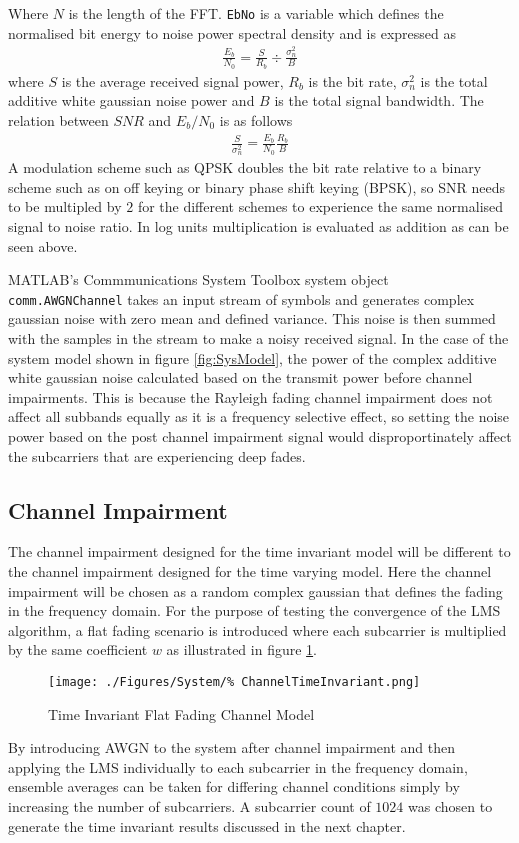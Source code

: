 Where $N$ is the length of the FFT. \texttt{EbNo} is a %
variable which defines the normalised bit energy %
to noise power spectral density and is %
expressed as
\begin{align}
	\frac{E_b}{N_0} = \frac{S}{R_b} \div 
	\frac{\sigma_n^{2}}{B}
\end{align}
where $S$ is the average received signal power, %
$R_b$ is the bit rate, $\sigma_n^{2}$ is the %
total additive white gaussian noise power and %
$B$ is the total signal bandwidth. The relation %
between $SNR$ and $E_b/N_0$ is as follows
\begin{align}
	\frac{S}{\sigma_n^{2}} = \frac{E_b}{N_0}
	\frac{R_b}{B}
\end{align}
A modulation scheme such as QPSK doubles the bit %
rate relative to a binary scheme such as on off %
keying or binary phase shift keying (BPSK), so %
SNR needs to be multipled by $2$ for the different %
schemes to experience the same normalised %
signal to noise ratio. In log units multiplication %
is evaluated as addition as can be seen above.

MATLAB's Commmunications System Toolbox system object %
\\\texttt{comm.AWGNChannel} takes an input stream of %
symbols and generates complex gaussian noise with %
zero mean and defined variance. This noise is then %
summed with the samples in the stream to make a noisy %
received signal. In the case of the system model shown in %
figure \ref{fig:SysModel}, the power of the complex %
additive white gaussian noise calculated based on the transmit %
power before channel impairments. This is because the Rayleigh %
fading channel impairment does not affect all subbands equally as %
it is a frequency selective effect, so setting the noise power based %
on the post channel impairment signal would disproportinately affect %
the subcarriers that are experiencing deep fades.

\subsection{Channel Impairment}
\label{sec:TIChannelImpairment}
The channel impairment designed for the time invariant model %
will be different to the channel impairment designed for the time varying model. %
Here the channel impairment will be chosen as a random complex gaussian that %
defines the fading in the frequency domain. For the purpose of testing the convergence %
of the LMS algorithm, a flat fading scenario is introduced where each subcarrier %
is multiplied by the same coefficient $w$ as illustrated in figure \ref{fig:TIChannel}.
\begin{figure}[ht]
	\texttt{[image: ./Figures/System/\%
	ChannelTimeInvariant.png]}
	\caption{Time Invariant Flat Fading Channel Model}
	\label{fig:TIChannel}
\end{figure}
By introducing AWGN to the system after channel impairment and then %
applying the LMS individually to each subcarrier in the frequency domain, %
ensemble averages can be taken for differing channel conditions simply by %
increasing the number of subcarriers. A subcarrier count of $1024$ was %
chosen to generate the time invariant results discussed in the next chapter. %

